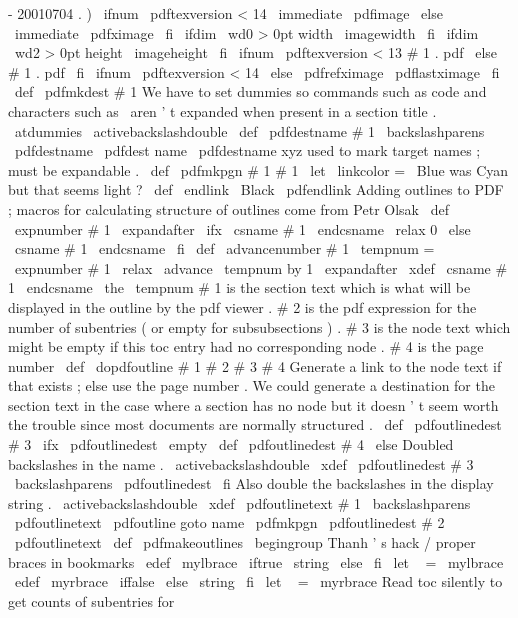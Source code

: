 {{-
20010704
.
)
\
ifnum
\
pdftexversion
<
14
\
immediate
\
pdfimage
\
else
\
immediate
\
pdfximage
\
fi
\
ifdim
\
wd0
>
0pt
width
\
imagewidth
\
fi
\
ifdim
\
wd2
>
0pt
height
\
imageheight
\
fi
\
ifnum
\
pdftexversion
<
13
#
1
.
pdf
%
\
else
{
#
1
.
pdf
}
%
\
fi
\
ifnum
\
pdftexversion
<
14
\
else
\
pdfrefximage
\
pdflastximage
\
fi
}
\
def
\
pdfmkdest
#
1
{
{
%
%
We
have
to
set
dummies
so
commands
such
as
code
and
characters
%
such
as
\
aren
'
t
expanded
when
present
in
a
section
title
.
\
atdummies
\
activebackslashdouble
\
def
\
pdfdestname
{
#
1
}
%
\
backslashparens
\
pdfdestname
\
pdfdest
name
{
\
pdfdestname
}
xyz
%
}
}
%
%
%
used
to
mark
target
names
;
must
be
expandable
.
\
def
\
pdfmkpgn
#
1
{
#
1
}
%
%
\
let
\
linkcolor
=
\
Blue
%
was
Cyan
but
that
seems
light
?
\
def
\
endlink
{
\
Black
\
pdfendlink
}
%
Adding
outlines
to
PDF
;
macros
for
calculating
structure
of
outlines
%
come
from
Petr
Olsak
\
def
\
expnumber
#
1
{
\
expandafter
\
ifx
\
csname
#
1
\
endcsname
\
relax
0
%
\
else
\
csname
#
1
\
endcsname
\
fi
}
\
def
\
advancenumber
#
1
{
\
tempnum
=
\
expnumber
{
#
1
}
\
relax
\
advance
\
tempnum
by
1
\
expandafter
\
xdef
\
csname
#
1
\
endcsname
{
\
the
\
tempnum
}
}
%
%
#
1
is
the
section
text
which
is
what
will
be
displayed
in
the
%
outline
by
the
pdf
viewer
.
#
2
is
the
pdf
expression
for
the
number
%
of
subentries
(
or
empty
for
subsubsections
)
.
#
3
is
the
node
text
%
which
might
be
empty
if
this
toc
entry
had
no
corresponding
node
.
%
#
4
is
the
page
number
%
\
def
\
dopdfoutline
#
1
#
2
#
3
#
4
{
%
%
Generate
a
link
to
the
node
text
if
that
exists
;
else
use
the
%
page
number
.
We
could
generate
a
destination
for
the
section
%
text
in
the
case
where
a
section
has
no
node
but
it
doesn
'
t
%
seem
worth
the
trouble
since
most
documents
are
normally
structured
.
\
def
\
pdfoutlinedest
{
#
3
}
%
\
ifx
\
pdfoutlinedest
\
empty
\
def
\
pdfoutlinedest
{
#
4
}
%
\
else
%
Doubled
backslashes
in
the
name
.
{
\
activebackslashdouble
\
xdef
\
pdfoutlinedest
{
#
3
}
%
\
backslashparens
\
pdfoutlinedest
}
%
\
fi
%
%
Also
double
the
backslashes
in
the
display
string
.
{
\
activebackslashdouble
\
xdef
\
pdfoutlinetext
{
#
1
}
%
\
backslashparens
\
pdfoutlinetext
}
%
%
\
pdfoutline
goto
name
{
\
pdfmkpgn
{
\
pdfoutlinedest
}
}
#
2
{
\
pdfoutlinetext
}
%
}
%
\
def
\
pdfmakeoutlines
{
%
\
begingroup
%
Thanh
'
s
hack
/
proper
braces
in
bookmarks
\
edef
\
mylbrace
{
\
iftrue
\
string
{
\
else
}
\
fi
}
\
let
\
{
=
\
mylbrace
\
edef
\
myrbrace
{
\
iffalse
{
\
else
\
string
}
\
fi
}
\
let
\
}
=
\
myrbrace
%
%
Read
toc
silently
to
get
counts
of
subentries
for
}}
